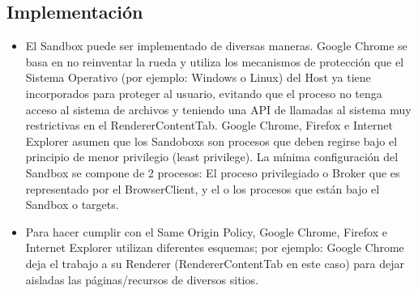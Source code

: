 \subsection{Implementación}
\begin{itemize}
\item El Sandbox puede ser implementado de diversas maneras. Google Chrome \cite{sandboxGC} se basa en no reinventar la rueda y utiliza los mecanismos de protección que el Sistema Operativo (por ejemplo: Windows o Linux) del Host ya tiene incorporados para proteger al usuario, evitando que el proceso no tenga acceso al sistema de archivos y teniendo una API de llamadas al sistema muy restrictivas en el RendererContentTab. Google Chrome, Firefox e Internet Explorer asumen que los Sandoboxs son procesos que deben regirse bajo el principio de menor privilegio (least privilege). La mínima configuración del Sandbox se compone de 2 procesos: El proceso privilegiado o Broker que es representado por el BrowserClient, y el o los procesos que están bajo el Sandbox o targets.
\item Para hacer cumplir con el Same Origin Policy, Google Chrome, Firefox e Internet Explorer utilizan diferentes esquemas; por ejemplo: Google Chrome deja el trabajo a su Renderer (RendererContentTab en este caso) para dejar aisladas las páginas/recursos de diversos sitios.
\end{itemize}
